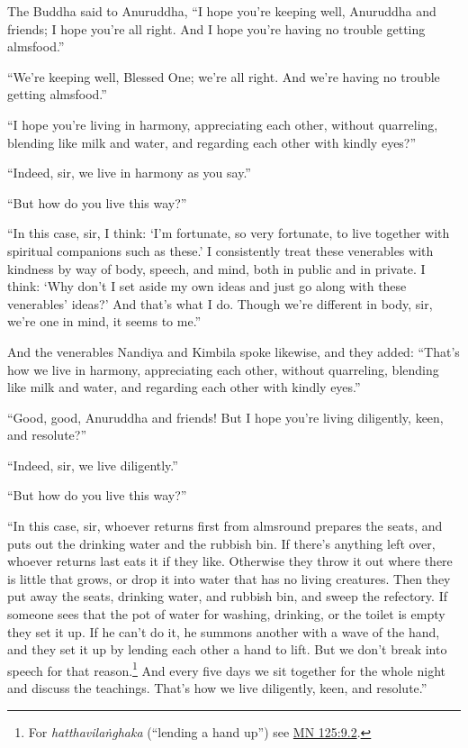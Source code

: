 \documentclass[12pt,openany]{book}%
\begin{document}
The Buddha said to Anuruddha, “I hope you’re keeping well, Anuruddha and friends; I hope you’re all right. And I hope you’re having no trouble getting almsfood.” 

“We’re keeping well, Blessed One; we’re all right. And we’re having no trouble getting almsfood.” 

“I hope you’re living in harmony, appreciating each other, without quarreling, blending like milk and water, and regarding each other with kindly eyes?” 

“Indeed, sir, we live in harmony as you say.” 

“But how do you live this way?” 

“In this case, sir, I think: ‘I’m fortunate, so very fortunate, to live together with spiritual companions such as these.’ I consistently treat these venerables with kindness by way of body, speech, and mind, both in public and in private. I think: ‘Why don’t I set aside my own ideas and just go along with these venerables’ ideas?’ And that’s what I do. Though we’re different in body, sir, we’re one in mind, it seems to me.” 

And the venerables Nandiya and Kimbila spoke likewise, and they added: “That’s how we live in harmony, appreciating each other, without quarreling, blending like milk and water, and regarding each other with kindly eyes.” 

“Good, good, Anuruddha and friends! But I hope you’re living diligently, keen, and resolute?” 

“Indeed, sir, we live diligently.” 

“But how do you live this way?” 

“In this case, sir, whoever returns first from almsround prepares the seats, and puts out the drinking water and the rubbish bin. If there’s anything left over, whoever returns last eats it if they like. Otherwise they throw it out where there is little that grows, or drop it into water that has no living creatures. Then they put away the seats, drinking water, and rubbish bin, and sweep the refectory. If someone sees that the pot of water for washing, drinking, or the toilet is empty they set it up. If he can’t do it, he summons another with a wave of the hand, and they set it up by lending each other a hand to lift. But we don’t break into speech for that reason.\footnote{For \textit{\textsanskrit{hatthavilaṅghaka}} (“lending a hand up”) see \href{https://suttacentral.net/mn125/en/sujato\#9.2}{MN 125:9.2}. } And every five days we sit together for the whole night and discuss the teachings. That’s how we live diligently, keen, and resolute.” 
\end{document}
